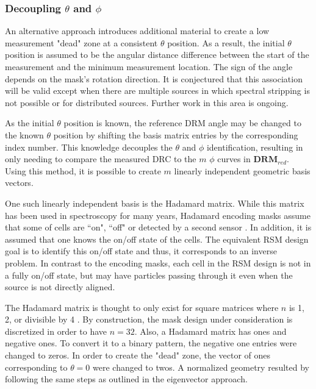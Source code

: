 \documentclass[3p,times]{elsarticle}
\begin{document}
\subsubsection{Decoupling $\theta$ and $\phi$}
An alternative approach introduces additional material to create a low measurement "dead" zone at a consistent $\theta$ position.  
As a result, the initial $\theta$ position is assumed to be the angular distance difference between the start of the measurement and the minimum measurement location.  
The sign of the angle depends on the mask's rotation direction.  
It is conjectured that this association will be valid except when there are multiple sources in which spectral stripping is not possible  or for distributed sources.  
Further work in this area is ongoing.

As the initial $\theta$ position is known, the reference DRM angle may be changed to the known $\theta$ position by shifting the basis matrix entries by the corresponding index number.
This knowledge decouples the $\theta$ and $\phi$ identification, resulting in only  needing to compare the measured DRC to the $m$ $\phi$ curves in $\mathbf{DRM}_{red}$.  
Using this method, it is possible to create $m$ linearly independent geometric basis vectors.

One such linearly independent basis is the Hadamard matrix.  
While this matrix has been used in spectroscopy for many years, Hadamard encoding masks assume that some of cells are ``on", ``off" or detected by a second sensor \cite{DeVerse00}.  
In addition, it is assumed that one knows the on/off state of the cells.  
The equivalent RSM design goal is to identify this on/off state and thus, it corresponds to an inverse problem.  
In contrast to the encoding masks, each cell in the RSM design is not in a fully on/off state, but may have particles passing through it even when the source is not directly aligned.

The Hadamard matrix is thought to only exist for square matrices where $n$ is 1, 2, or divisible by 4 \cite{Sloane76}.  
By construction, the mask design under consideration is discretized in order to have $n=32$.  
Also, a Hadamard matrix has ones and negative ones.  
To convert it to a binary pattern, the negative one entries were changed to zeros.
In order to create the "dead" zone, the vector of ones corresponding to $\theta=0$ were changed to twos.  
A normalized geometry resulted by following the same steps as outlined in the eigenvector approach.
\end{document}
